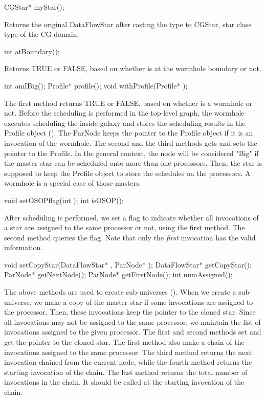 \begin{example}
CGStar* myStar();
\end{example}

Returns the original DataFlowStar after casting the type to CGStar, star
class type of the CG domain.

\begin{example}
int atBoundary();
\end{example}

Returns TRUE or FALSE, based on whether  is at the wormhole
boundary or not.

\begin{example}
int amIBig();
Profile* profile();
void withProfile(Profile* );
\end{example}

The first method returns TRUE or FALSE, based on whether  is
a wormhole or not. 
Before the scheduling is performed in the top-level graph, the wormhole
executes scheduling the inside galaxy and stores the scheduling results
in the Profile object (). The ParNode keeps the pointer
to the Profile object if it is an invocation of the wormhole. The second
and the third methods gets and sets the pointer to the Profile. In the
general context, the node will be considered "Big" if the master star
can be scheduled onto more than one processors. Then, the star
is supposed to keep the Profile object to store the schedules on the
processors. A wormhole is a special case of those masters.

\begin{example}
void setOSOPflag(int );
int isOSOP();
\end{example}

After scheduling is performed, we set a flag to indicate whether all
invocations of a star are assigned to the same processor or not, using the
first method. The second method queries the flag. Note that only the
\emph{first} invocation has the valid information.

\begin{example}
void setCopyStar(DataFlowStar* , ParNode* );
DataFlowStar* getCopyStar();
ParNode* getNextNode();
ParNode* getFirstNode();
int numAssigned();
\end{example}

The above methods are used to create sub-universes 
(). When we create a sub-universe, we make a
copy of the master star if some invocations are assigned to the processor.
Then, these invocations keep the pointer to the cloned star. Since
all invocations may not be assigned to the same processor, we maintain
the list of invocations assigned to the given processor. The first and
second methods set and get the pointer to the cloned star. The first method
also make a chain of the invocations assigned to the same processor.
The third method returns the next invocation chained from the current node,
while the fourth method returns the starting invocation of the chain. The
last method returns the total number of invocations in the chain. It should
be called at the starting invocation of the chain.

